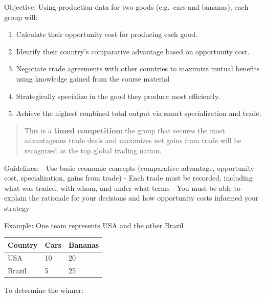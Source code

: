 \documentclass[
  11pt,
]{article}
\providecommand{\tightlist}{%
  \setlength{\itemsep}{0pt}\setlength{\parskip}{0pt}}
\begin{document}
Objective: Using production data for two goods (e.g.~cars and bananas),
each group will:

\begin{enumerate}
\def\labelenumi{\arabic{enumi}.}
\tightlist
\item
  Calculate their opportunity cost for producing each good.
\item
  Identify their country's comparative advantage based on opportunity
  cost.
\item
  Negotiate trade agreements with other countries to maximize mutual
  benefits using knowledge gained from the course material
\item
  Strategically specialize in the good they produce most efficiently.
\item
  Achieve the highest combined total output via smart specialization and
  trade.
\end{enumerate}

\begin{quote}
This is a \textbf{timed competition:} the group that secures the most
advantageous trade deals and maximizes net gains from trade will be
recognized as the top global trading nation.
\end{quote}

Guidelines: - Use basic economic concepts (comparative advantage,
opportunity cost, specialization, gains from trade) - Each trade must be
recorded, including what was traded, with whom, and under what terms -
You must be able to explain the rationale for your decisions and how
opportunity costs informed your strategy

Example: One team represents USA and the other Brazil

\begin{longtable}[]{@{}lll@{}}
\toprule\noalign{}
Country & Cars & Bananas \\
\midrule\noalign{}
\endhead
\bottomrule\noalign{}
\endlastfoot
USA & 10 & 20 \\
Brazil & 5 & 25 \\
\end{longtable}

To determine the winner:
\end{document}
